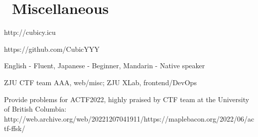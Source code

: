 \documentclass{resume}
\begin{document}
\section{\faInfo\ Miscellaneous}
\begin{description}[parsep=0.5ex]
  \item[Blog] http://cubicy.icu
  \item[GitHub] https://github.com/CubicYYY
  \item[Languages] English - Fluent, Japanese - Beginner, Mandarin - Native speaker
  \item[Team] ZJU CTF team AAA, web/misc; ZJU XLab, frontend/DevOps
  \item[Other] Provide problems for ACTF2022, highly praised by CTF team at the University of British Columbia: http://web.archive.org/web/20221207041911/https://maplebacon.org/2022/06/actf-ffsk/
\end{description}

%
%
\end{document}
